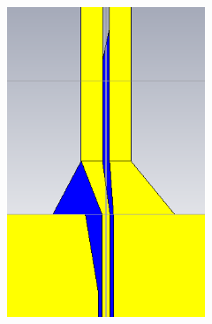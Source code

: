 \documentclass[aspectratio=169]{beamer}
\begin{document}
\begin{frame}
\begin{columns}
				\includegraphics[width=0.7\textwidth]{balun_3.png}
		\end{columns}
\end{frame}
\end{document}
